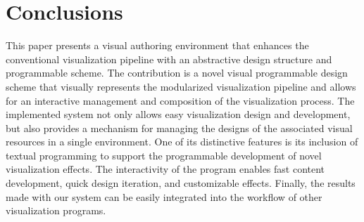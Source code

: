 \section{Conclusions}
\label{sec:con}
This paper presents a visual authoring environment that enhances the conventional visualization pipeline with an abstractive design structure and programmable scheme. The contribution is a novel visual programmable design scheme that visually represents the modularized visualization pipeline and allows for an interactive management and composition of the visualization process. The implemented system not only allows easy visualization design and development, but also provides a mechanism for managing the designs of the associated visual resources in a single environment. One of its distinctive features is its inclusion of textual programming to support the programmable development of novel visualization effects. The interactivity of the program enables fast content development, quick design iteration, and customizable effects. Finally, the results made with our system can be easily integrated into the workflow of other visualization programs.
